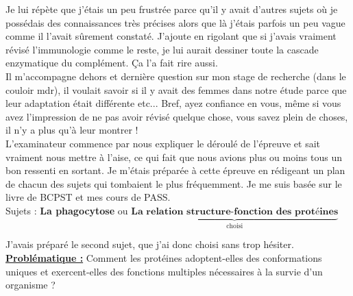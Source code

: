 Je lui répète que j’étais un peu frustrée parce qu’il y avait d’autres sujets où je possédais des connaissances très précises alors que là j’étais parfois un peu vague comme il l’avait sûrement constaté. J’ajoute en rigolant que si j’avais vraiment révisé l’immunologie comme le reste, je lui aurait dessiner toute la cascade enzymatique du complément. Ça l’a fait rire aussi.\\
Il m’accompagne dehors et dernière question sur mon stage de recherche (dans le couloir mdr), il voulait savoir si il y avait des femmes dans notre étude parce que leur adaptation était différente etc... Bref, ayez confiance en vous, même si vous avez l’impression de ne pas avoir révisé quelque chose, vous savez plein de choses, il n’y a plus qu’à leur montrer !\\


\lettrine{{\color{violet} \oldpilcrowfive}}{}
L’examinateur commence par nous expliquer le déroulé de l’épreuve et sait vraiment nous mettre à l’aise, ce qui fait que nous avions plus ou moins tous un bon ressenti en sortant. Je m’étais préparée à cette épreuve en rédigeant un plan de chacun des sujets qui tombaient le plus fréquemment. Je me suis basée sur le livre de BCPST et mes cours de PASS.\\


Sujets : \textbf{La phagocytose} ou $\underbrace{\textbf{La relation structure-fonction des protéines}}_{\text{choisi}}$

J’avais préparé le second sujet, que j’ai donc choisi sans trop hésiter.\\

\uline{\textbf{Problématique :}} Comment les protéines adoptent-elles des conformations uniques et exercent-elles des fonctions multiples nécessaires à la survie d’un organisme ?\\

